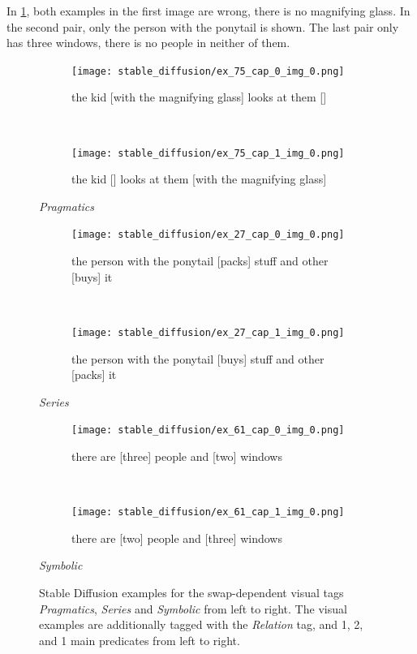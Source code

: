 In \cref{fig:stable-diffusion-examples-visual}, both examples in the first image are wrong, there is no magnifying glass. In the second pair, only the person with the ponytail is shown. The last pair only has three windows, there is no people in neither of them.

\begin{figure}[ht]
\centering
    \begin{minipage}{.30\textwidth}
        \begin{subfigure}{\textwidth}
        \centering
        \texttt{[image: stable\_diffusion/ex\_75\_cap\_0\_img\_0.png]}
        \caption{the kid [with the magnifying glass] looks at them []}
        \end{subfigure}\\
        \begin{subfigure}{\textwidth}
        \centering
        \texttt{[image: stable\_diffusion/ex\_75\_cap\_1\_img\_0.png]}
        \caption{the kid [] looks at them [with the magnifying glass]}
        \end{subfigure}%
        \caption*{\textit{Pragmatics}}
    \end{minipage}
    \hfill
    \begin{minipage}{.30\textwidth}
        \begin{subfigure}{\textwidth}
        \centering
        \texttt{[image: stable\_diffusion/ex\_27\_cap\_0\_img\_0.png]}
        \caption{the person with the ponytail [packs] stuff and other [buys] it}
        \end{subfigure}\\
        \begin{subfigure}{\textwidth}
        \centering
        \texttt{[image: stable\_diffusion/ex\_27\_cap\_1\_img\_0.png]}
        \caption{the person with the ponytail [buys] stuff and other [packs] it}
        \end{subfigure}%
        \caption*{\textit{Series}}
    \end{minipage}
    \hfill
    \begin{minipage}{.30\textwidth}
        \begin{subfigure}{\textwidth}
        \centering
        \texttt{[image: stable\_diffusion/ex\_61\_cap\_0\_img\_0.png]}
        \caption{there are [three] people and [two] windows}
        \end{subfigure}\\
        \begin{subfigure}{\textwidth}
        \centering
        \texttt{[image: stable\_diffusion/ex\_61\_cap\_1\_img\_0.png]}
        \caption{there are [two] people and [three] windows}
        \end{subfigure}%
        \caption*{\textit{Symbolic}}
    \end{minipage}
    \caption{Stable Diffusion examples for the swap-dependent visual tags \textit{Pragmatics}, \textit{Series} and \textit{Symbolic} from left to right. The visual examples are additionally tagged with the \textit{Relation} tag, and 1, 2, and 1 main predicates from left to right.}
    \label{fig:stable-diffusion-examples-visual}
\end{figure}

